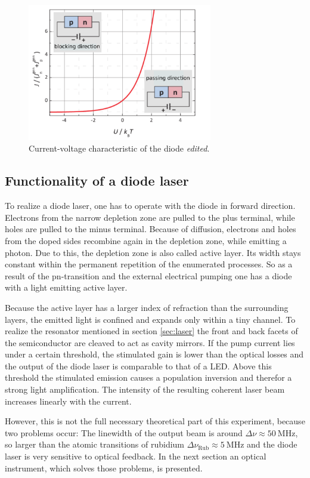 \begin{figure}
  \centering
  \includegraphics[height=6cm]{Ordnername/currvolt_edit.pdf}
  \caption{Current-voltage characteristic of the diode \cite{semiconductors} \textit{edited}.}
  \label{fig:currvolt}
\end{figure}

\subsection{Functionality of a diode laser}
\label{sec:funclaser}

To realize a diode laser, one has to operate with the diode in forward direction.
Electrons from the narrow depletion zone are pulled to the plus terminal, while
holes are pulled to the minus terminal. Because of diffusion, electrons and holes from the doped sides
recombine again in the depletion zone, while emitting a photon. Due to this, the depletion zone is
also called active layer. Its width stays constant within the permanent repetition of the enumerated
processes. So as a result of the pn-transition and the external electrical pumping one has a diode
with a light emitting active layer.

Because the active layer has a larger index of refraction than the surrounding layers, the emitted light is confined
and expands only within a tiny channel. To realize the resonator mentioned in section \ref{sec:laser} the front
and back facets of the semiconductor are cleaved to act as cavity mirrors. If the pump current lies under a
certain threshold, the stimulated gain is lower than the optical losses and the output of the diode laser is
comparable to that of a LED. Above this threshold the stimulated emission causes a population inversion and therefor
a strong light amplification. The intensity of the resulting coherent laser beam increases linearly with the current.

However, this is not the full necessary theoretical part of this experiment, because two problems occur:
The linewidth of the output beam is around $\Delta \nu \approx \SI{50}{\mega\hertz}$, so larger than the atomic transitions
of rubidium $\Delta \nu_\text{Rub} \approx \SI{5}{\mega\hertz}$ and the diode laser is very sensitive to optical feedback.
In the next section an optical instrument, which solves those problems, is presented.

